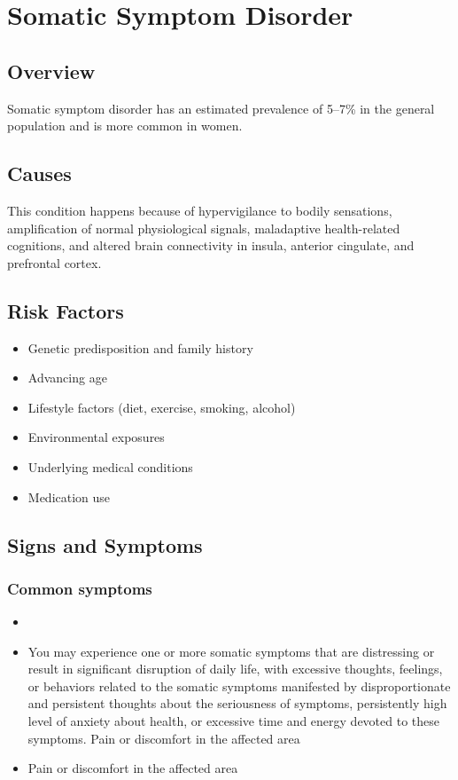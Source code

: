 \chapter{Somatic Symptom Disorder}
\label{sec:Somatic Symptom Disorder}

\section{Overview}
Somatic symptom disorder has an estimated prevalence of 5--7\% in the general population and is more common in women.
\section{Causes}
This condition happens because of hypervigilance to bodily sensations, amplification of normal physiological signals, maladaptive health-related cognitions, and altered brain connectivity in insula, anterior cingulate, and prefrontal cortex.     
\section{Risk Factors}

\begin{itemize}[noitemsep]
  \item Genetic predisposition and family history
  \item Advancing age
  \item Lifestyle factors (diet, exercise, smoking, alcohol)
  \item Environmental exposures
  \item Underlying medical conditions
  \item Medication use
\end{itemize}
\section{Signs and Symptoms}

\subsection{Common symptoms}
\begin{itemize}[noitemsep]
  \item \item You may experience one or more somatic symptoms that are distressing or result in significant disruption of daily life, with excessive thoughts, feelings, or behaviors related to the somatic symptoms manifested by disproportionate and persistent thoughts about the seriousness of symptoms, persistently high level of anxiety about health, or excessive time and energy devoted to these symptoms. Pain or discomfort in the affected area    \item Pain or discomfort in the affected area
  \end{itemize}

